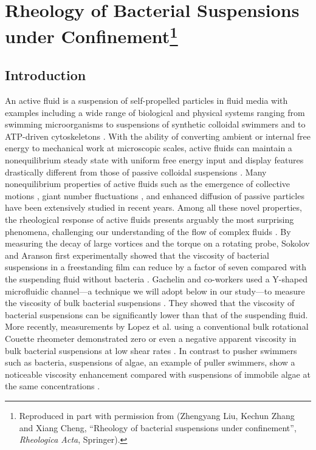\chapter[Rheology under Confinement]{Rheology of Bacterial Suspensions under Confinement\footnote[1]{
Reproduced in part with permission from (Zhengyang Liu, Kechun Zhang and Xiang Cheng, ``Rheology of bacterial suspensions under confinement'', \textit{Rheologica Acta}, Springer).
}}

\label{rheology-of-bacterial-suspensions-under-confinement}

\section{Introduction}
An active fluid is a suspension of self-propelled particles in fluid media with examples including a wide range of biological and physical systems ranging from swimming microorganisms
\cite{Schwarz-Linek2016} to suspensions of synthetic colloidal swimmers \cite{Palacci2010, Palacci2013, Bricard2013} and to ATP-driven cytoskeletons \cite{Sanchez2012, Schaller2010}.
With the ability of converting ambient or internal free energy to mechanical work at microscopic scales, active fluids can maintain a nonequilibrium steady state with uniform free energy input and display features drastically different from those of passive colloidal suspensions \cite{Koch2011, Marchetti2013, Bechinger2016, Elgeti2015, Saintillan2015}.
Many nonequilibrium properties of active fluids such as the emergence of collective motions \cite{Sokolov2012, Wensink2012, Cisneros2011, Guo2018}, giant number fluctuations \cite{Narayan2007, Zhang2010},
and enhanced diffusion of passive particles \cite{Wu2000, Mino2013, Morozov2014, Peng2016, Yang2016} have been extensively studied in recent years. Among all these novel properties, the rheological response of active fluids presents arguably the most surprising phenomena, challenging our understanding of the flow of complex fluids \cite{Saintillan2018}. By measuring the decay of large vortices and the torque on a rotating probe, Sokolov and Aranson first experimentally showed that the viscosity of bacterial suspensions in a freestanding film can reduce by a factor of seven compared with the suspending fluid without bacteria \cite{Sokolov2009}. Gachelin and co-workers used a Y-shaped microfluidic channel---a technique we will adopt below in our study---to measure the viscosity of bulk bacterial suspensions \cite{Gachelin2013}. They showed that the viscosity of bacterial suspensions can be significantly lower than that of the suspending fluid.
More recently, measurements by Lopez et al. using a conventional bulk rotational Couette rheometer demonstrated zero or even a negative apparent viscosity in bulk bacterial suspensions at low shear rates \cite{Lopez2015}. In contrast to pusher swimmers such as bacteria, suspensions of algae, an example of puller swimmers, show a noticeable viscosity enhancement compared with suspensions of immobile algae at the same concentrations \cite{Rafai2010}.

